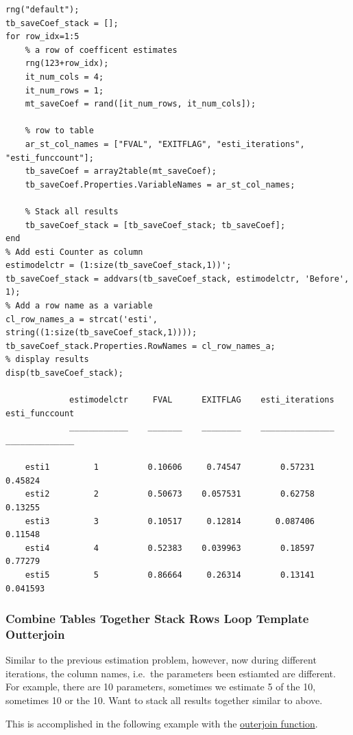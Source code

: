 \documentclass[
]{book}
\begin{document}
\begin{verbatim}
rng("default");
tb_saveCoef_stack = [];
for row_idx=1:5
    % a row of coefficent estimates    
    rng(123+row_idx);
    it_num_cols = 4;
    it_num_rows = 1;
    mt_saveCoef = rand([it_num_rows, it_num_cols]);
    
    % row to table
    ar_st_col_names = ["FVAL", "EXITFLAG", "esti_iterations", "esti_funccount"];        
    tb_saveCoef = array2table(mt_saveCoef);
    tb_saveCoef.Properties.VariableNames = ar_st_col_names;
    
    % Stack all results
    tb_saveCoef_stack = [tb_saveCoef_stack; tb_saveCoef];
end
% Add esti Counter as column
estimodelctr = (1:size(tb_saveCoef_stack,1))';
tb_saveCoef_stack = addvars(tb_saveCoef_stack, estimodelctr, 'Before', 1);
% Add a row name as a variable
cl_row_names_a = strcat('esti', string((1:size(tb_saveCoef_stack,1))));
tb_saveCoef_stack.Properties.RowNames = cl_row_names_a;
% display results
disp(tb_saveCoef_stack);

             estimodelctr     FVAL      EXITFLAG    esti_iterations    esti_funccount
             ____________    _______    ________    _______________    ______________

    esti1         1          0.10606     0.74547        0.57231            0.45824   
    esti2         2          0.50673    0.057531        0.62758            0.13255   
    esti3         3          0.10517     0.12814       0.087406            0.11548   
    esti4         4          0.52383    0.039963        0.18597            0.77279   
    esti5         5          0.86664     0.26314        0.13141           0.041593   
\end{verbatim}

\hypertarget{combine-tables-together-stack-rows-loop-template-outterjoin}{%
\subsubsection{Combine Tables Together Stack Rows Loop Template Outterjoin}\label{combine-tables-together-stack-rows-loop-template-outterjoin}}

Similar to the previous estimation problem, however, now during
different iterations, the column names, i.e.~the parameters been
estiamted are different. For example, there are 10 parameters, sometimes
we estimate 5 of the 10, sometimes 10 or the 10. Want to stack all
results together similar to above.

This is accomplished in the following example with the \href{https://www.mathworks.com/help/matlab/ref/outerjoin.html}{outerjoin
function}.
\end{document}
